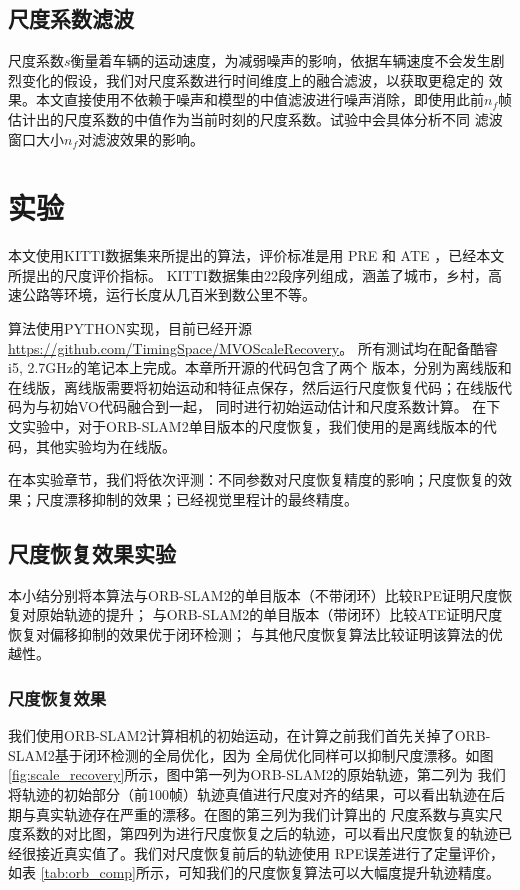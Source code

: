 \subsection{尺度系数滤波}
尺度系数$s$衡量着车辆的运动速度，为减弱噪声的影响，依据车辆速度不会发生剧烈变化的假设，我们对尺度系数进行时间维度上的融合滤波，以获取更稳定的
效果。本文直接使用不依赖于噪声和模型的中值滤波进行噪声消除，即使用此前$n_f$帧估计出的尺度系数的中值作为当前时刻的尺度系数。试验中会具体分析不同
滤波窗口大小$n_f$对滤波效果的影响。

\section{实验}
\label{sec:experiments}
本文使用KITTI数据集\cite{geiger2012kitti}来所提出的算法，评价标准是用
PRE \cite{geiger2012kitti} 和 ATE \cite{sturm2012benchmark}，已经本文所提出的尺度评价指标。
KITTI数据集由22段序列组成，涵盖了城市，乡村，高速公路等环境，运行长度从几百米到数公里不等。

算法使用PYTHON实现，目前已经开源\url{https://github.com/TimingSpace/MVOScaleRecovery}。
所有测试均在配备酷睿i5, 2.7GHz的笔记本上完成。本章所开源的代码包含了两个
版本，分别为离线版和在线版，离线版需要将初始运动和特征点保存，然后运行尺度恢复代码；在线版代码为与初始VO代码融合到一起，
同时进行初始运动估计和尺度系数计算。
在下文实验中，对于ORB-SLAM2单目版本的尺度恢复，我们使用的是离线版本的代码，其他实验均为在线版。

在本实验章节，我们将依次评测：不同参数对尺度恢复精度的影响；尺度恢复的效果；尺度漂移抑制的效果；已经视觉里程计的最终精度。

\subsection{尺度恢复效果实验}
本小结分别将本算法与ORB-SLAM2的单目版本（不带闭环）比较RPE证明尺度恢复对原始轨迹的提升；
与ORB-SLAM2的单目版本（带闭环）比较ATE证明尺度恢复对偏移抑制的效果优于闭环检测；
与其他尺度恢复算法比较证明该算法的优越性。
\subsubsection{尺度恢复效果}
\label{sec:eva_scale_recovery}
我们使用ORB-SLAM2计算相机的初始运动，在计算之前我们首先关掉了ORB-SLAM2基于闭环检测的全局优化，因为
全局优化同样可以抑制尺度漂移。如图\ref{fig:scale_recovery}所示，图中第一列为ORB-SLAM2的原始轨迹，第二列为
我们将轨迹的初始部分（前100帧）轨迹真值进行尺度对齐的结果，可以看出轨迹在后期与真实轨迹存在严重的漂移。在图的第三列为我们计算出的
尺度系数与真实尺度系数的对比图，第四列为进行尺度恢复之后的轨迹，可以看出尺度恢复的轨迹已经很接近真实值了。我们对尺度恢复前后的轨迹使用
RPE误差进行了定量评价，如表 \ref{tab:orb_comp}所示，可知我们的尺度恢复算法可以大幅度提升轨迹精度。

